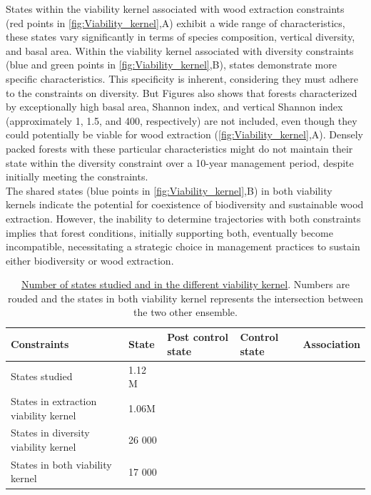 \documentclass{article}
\begin{document}
States within the viability kernel associated with wood extraction constraints (red points in \ref{fig:Viability_kernel},A) exhibit a wide range of characteristics, these states vary significantly in terms of species composition, vertical diversity, and basal area. Within the viability kernel associated with diversity constraints (blue and green points in \ref{fig:Viability_kernel},B), states demonstrate more specific characteristics. This specificity is inherent, considering they must adhere to the constraints on diversity. But Figures also shows that forests characterized by exceptionally high basal area, Shannon index, and vertical Shannon index (approximately 1, 1.5, and 400, respectively) are not included, even though they could potentially be viable for wood extraction (\ref{fig:Viability_kernel},A). Densely packed forests with these particular characteristics might do not maintain their state within the diversity constraint over a 10-year management period, despite initially meeting the constraints.\\
The shared states (blue points in \ref{fig:Viability_kernel},B) in both viability kernels indicate the potential for coexistence of biodiversity and sustainable wood extraction. However, the inability to determine trajectories with both constraints implies that forest conditions, initially supporting both, eventually become incompatible, necessitating a strategic choice in management practices to sustain either biodiversity or wood extraction.

\begin{table}[t!]
    \centering
    \begin{tabular}{l l l l l}
    \hline
    \hline
    \textbf{Constraints} & \textbf{State} & \textbf{Post control state} & \textbf{Control state} & \textbf{Association} \\
    \hline
    States studied & 1.12 M \\
    States in extraction viability kernel & 1.06M \\
    States in diversity viability kernel  & 26 000 \\
    States in both viability kernel & 17 000 \\
    \hline
    \hline
    \end{tabular}
    \caption{\underline{Number of states studied and in the different viability kernel}. Numbers are rouded and the states in both viability kernel represents the intersection between the two other ensemble.}
    \label{tab:Viability_kernel}
\end{table}
\end{document}
